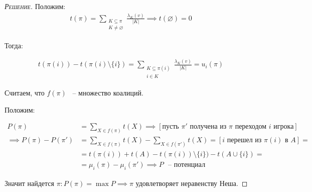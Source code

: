 \begin{proof}[\normalfont\textsc{Решение}]
	Положим:
	\begin{align*}
		t(\pi) = \sum_{\substack{K \subseteq \pi \\ K \neq \varnothing}} \frac{\lambda_K(v)}{|K|} \implies t(\varnothing) = 0
	\end{align*}

	Тогда:

	\begin{align*}
		t(\pi(i)) - t(\pi(i) \setminus \{i\}) = \sum_{\substack{K \subseteq \pi(i) \\ i \in K}} \frac{\lambda_K(v)}{|K|} = u_i(\pi)
	\end{align*}

	Считаем, что $f(\pi)$ ~-- множество коалиций.

	Положим:

	\begin{align*}
		P(\pi) &= \sum_{X \in f(\pi)} t(X) \implies [\text{пусть $\pi'$ получена из  $\pi$ переходом  $i$ игрока}] \\
		\implies P(\pi) - P(\pi') &= \sum_{X \in f(\pi)} t(X) - \sum_{X \in f(\pi')} t(X) =  [\text{$i$ перешел из  $\pi(i)$ в  $A$}] = \\
		&= t(\pi(i)) + t(A) - t(\pi(i)) \setminus \{i\}) - t(A \cup \{i\}) = \\
		&= \mu_i(\pi) - \mu_i(\pi') \implies P \text{ ~-- потенциал }
	\end{align*}

	Значит найдется $\pi \colon P(\pi) = \max P \implies \pi$ удовлетворяет неравенству Неша.

\end{proof}


